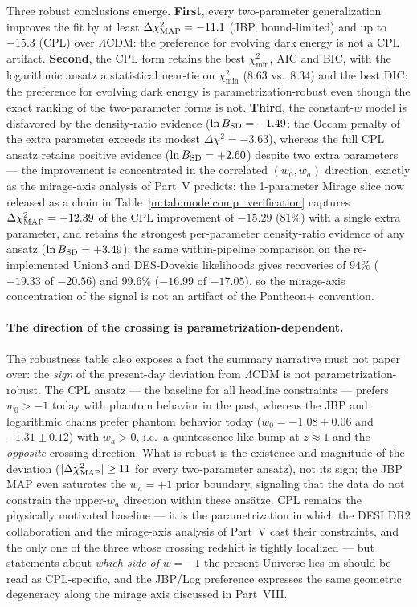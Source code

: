 \documentclass[aps,prd,preprint,superscriptaddress,nofootinbib]{revtex4-2}
\begin{document}
Three robust conclusions emerge. \textbf{First}, every two-parameter generalization improves the fit by at least $\Delta\chi^2_{\rm MAP} = -11.1$ (JBP, bound-limited) and up to $-15.3$ (CPL) over $\Lambda$CDM: the preference for evolving dark energy is not a CPL artifact. \textbf{Second}, the CPL form retains the best $\chi^2_{\min}$, AIC and BIC, with the logarithmic ansatz a statistical near-tie on $\chi^2_{\min}$ (8.63 vs.\ 8.34) and the best DIC: the preference for evolving dark energy is parametrization-robust even though the exact ranking of the two-parameter forms is not. \textbf{Third}, the constant-$w$ model is disfavored by the density-ratio evidence ($\ln B_{\rm SD} = -1.49$: the Occam penalty of the extra parameter exceeds its modest $\Delta\chi^2 = -3.63$), whereas the full CPL ansatz retains positive evidence ($\ln B_{\rm SD} = +2.60$) despite two extra parameters --- the improvement is concentrated in the correlated $(w_0, w_a)$ direction, exactly as the mirage-axis analysis of Part~V predicts: the 1-parameter Mirage slice now released as a chain in Table~\ref{m:tab:modelcomp_verification} captures $\Delta\chi^2_{\rm MAP} = -12.39$ of the CPL improvement of $-15.29$ ($81\%$) with a single extra parameter, and retains the strongest per-parameter density-ratio evidence of any ansatz ($\ln B_{\rm SD} = +3.49$); the same within-pipeline comparison on the re-implemented Union3 and DES-Dovekie likelihoods gives recoveries of $94\%$ ($-19.33$ of $-20.56$) and $99.6\%$ ($-16.99$ of $-17.05$), so the mirage-axis concentration of the signal is not an artifact of the Pantheon+ convention.

\paragraph{The direction of the crossing is parametrization-dependent.} The robustness table also exposes a fact the summary narrative must not paper over: the \emph{sign} of the present-day deviation from $\Lambda$CDM is not parametrization-robust. The CPL ansatz --- the baseline for all headline constraints --- prefers $w_0 > -1$ today with phantom behavior in the past, whereas the JBP and logarithmic chains prefer phantom behavior today ($w_0 = -1.08 \pm 0.06$ and $-1.31 \pm 0.12$) with $w_a > 0$, i.e.\ a quintessence-like bump at $z \approx 1$ and the \emph{opposite} crossing direction. What is robust is the existence and magnitude of the deviation ($|\Delta\chi^2_{\rm MAP}| \ge 11$ for every two-parameter ansatz), not its sign; the JBP MAP even saturates the $w_a = +1$ prior boundary, signaling that the data do not constrain the upper-$w_a$ direction within these ans\"atze. CPL remains the physically motivated baseline --- it is the parametrization in which the DESI DR2 collaboration and the mirage-axis analysis of Part~V cast their constraints, and the only one of the three whose crossing redshift is tightly localized --- but statements about \emph{which side of} $w = -1$ the present Universe lies on should be read as CPL-specific, and the JBP/Log preference expresses the same geometric degeneracy along the mirage axis discussed in Part~VIII.
\end{document}
